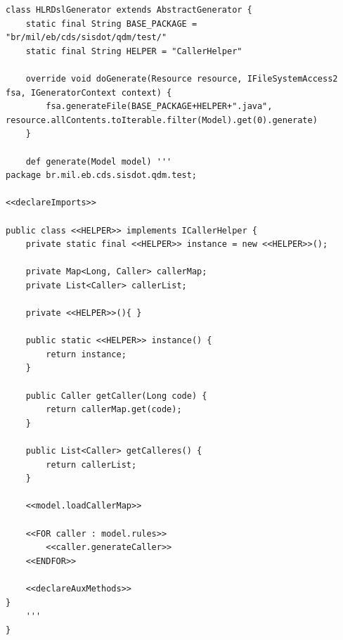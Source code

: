 \documentclass[twocolumn]{bmcart}%
\begin{document}
\begin{small}
\begin{lstlisting}[frame=single, language=Xtend, caption={\it Code Generation}, label={code:xtend_generator}]
class HLRDslGenerator extends AbstractGenerator {
	static final String BASE_PACKAGE = "br/mil/eb/cds/sisdot/qdm/test/"
	static final String HELPER = "CallerHelper"

	override void doGenerate(Resource resource, IFileSystemAccess2 fsa, IGeneratorContext context) {		
		fsa.generateFile(BASE_PACKAGE+HELPER+".java", resource.allContents.toIterable.filter(Model).get(0).generate)
	}

	def generate(Model model) '''
package br.mil.eb.cds.sisdot.qdm.test;
		
<<declareImports>>

public class <<HELPER>> implements ICallerHelper {
	private static final <<HELPER>> instance = new <<HELPER>>();
	
	private Map<Long, Caller> callerMap;
	private List<Caller> callerList;
	
	private <<HELPER>>(){ }
	
	public static <<HELPER>> instance() {
		return instance;
	}
	
	public Caller getCaller(Long code) {
		return callerMap.get(code);
	}
	
	public List<Caller> getCalleres() {
		return callerList;
	}
	
	<<model.loadCallerMap>>
	
	<<FOR caller : model.rules>>
		<<caller.generateCaller>>
	<<ENDFOR>>
			
	<<declareAuxMethods>>
}
	'''
}
\end{lstlisting}
\end{small}




\end{document}

